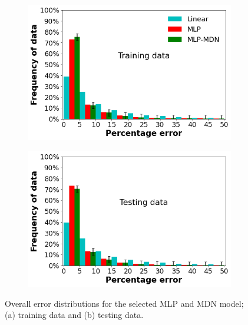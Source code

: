 \documentclass[a4paper,fleqn]{cas-sc}
\begin{document}
\begin{figure}[h!]
\centering
    \begin{subfigure}{0.48\textwidth}
    \includegraphics[width=\textwidth]{OVERALL_TRAIN}
    \caption{}
    \end{subfigure}
    \begin{subfigure}{0.48\textwidth}
    \includegraphics[width=\textwidth]{OVERALL_TEST}
    \caption{}
    \end{subfigure}
    \caption{Overall error distributions for the selected MLP and MDN model; (a) training data and (b) testing data.}\label{fig_frequency_data}
\end{figure}
\end{document}
